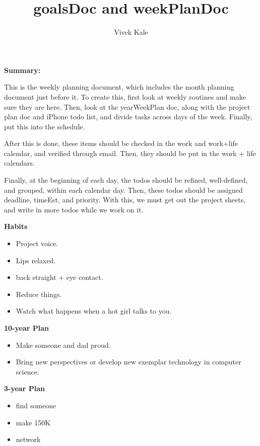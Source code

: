 \documentclass[serif, mathserif, final]{beamer}
\title{goalsDoc and weekPlanDoc}
\author{Vivek Kale}
\begin{document}
\maketitle 

\textbf{Summary:} {\small This is the weekly planning document, which includes 
the month planning document just before it. To create this, first look
at weekly routines and make sure they are 
here. Then, look at the yearWeekPlan doc, along with the project plan
doc and iPhone todo list, and divide tasks across days of the
week. Finally, put this into the schedule. 

After this is done, these items should be checked in the work and
work+life calendar, and verified through email. 
Then, they should be put in the work + life
calendars.

Finally, at the beginning of each day, the todos should be refined,
well-defined, and grouped, within each calendar day. Then, these todos
should be assigned deadline, timeEst, and priority. 
With this, we must get out the project sheets, and write in more todos
while we work on it. 
}

\newpage 

\textbf{Habits}
\begin{itemize}
  \tiny \item \tiny Project voice. 
\item \tiny Lips relaxed.
  \tiny \item \tiny back straight + eye contact.
\item \tiny Reduce things.
\item \tiny Watch what happens when a hot girl talks to you.
\end{itemize} 

\newpage
\textbf{10-year Plan}
\begin{itemize}
\small \item \small Make someone and dad proud. 
\item \small Bring new perspectives or develop new exemplar technology
  in computer science. 
\end{itemize}

\textbf{3-year Plan} 
\begin{itemize} 
  \small \item \small find someone
\item \small make 150K
\item \small network
\end{itemize} 
\end{document}
